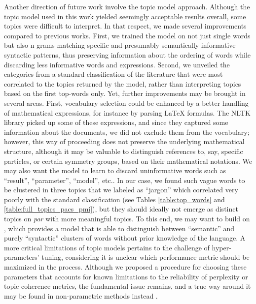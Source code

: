 \documentclass[smallextended]{svjour3}
\begin{document}
Another direction of future work involve the topic model approach. Although the topic model used in this work yielded seemingly acceptable results overall, some topics were difficult to interpret. In that respect, we made several improvements compared to previous works. First, we trained the model on not just single words but also n-grams matching specific and presumably semantically informative syntactic patterns, thus preserving information about the ordering of words while discarding less informative words and expressions. Second, we unveiled the categories from a standard classification of the literature that were most correlated to the topics returned by the model, rather than interpreting topics based on the first top-words only. Yet, further improvements may be brought in several areas. First, vocabulary selection could be enhanced by a better handling of mathematical expressions, for instance by parsing LaTeX formulas. The NLTK library picked up some of these expressions, and since they captured some information about the documents, we did not exclude them from the vocabulary; however, this way of proceeding does not preserve the underlying mathematical structure, although it may be valuable to distinguish references to, say, specific particles, or certain symmetry groups, based on their mathematical notations. We may also want the model to learn to discard uninformative words such as ``result'', ``parameter'', ``model'', etc.. In our case, we found such vague words to be clustered in three topics that we labeled as ``jargon'' which correlated very poorly with the standard classification  (see Tables \ref{table:top_words} and \ref{table:full_topics_pacs_pmi}), but they should ideally not emerge as distinct topics on \textit{par} with more meaningful topics. To this end, we may want to build on \citealt{syntax_topic_model}, which provides a model that is able to distinguish between ``semantic'' and purely ``syntactic'' clusters of words without  prior knowledge of the language. A more critical limitations of topic models pertains to the challenge of hyper-parameters' tuning, considering it is unclear which performance metric should be maximized in the process. Although we proposed a procedure for choosing these parameters that accounts for known limitations to the reliability of perplexity or topic coherence metrics, the fundamental issue remains, and a true way around it may be found in non-parametric methods instead \citep{Gerlach2018}.
\end{document}
